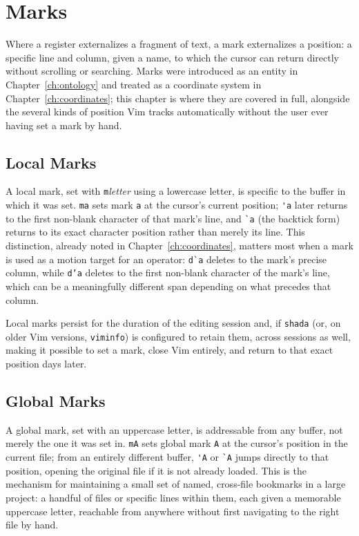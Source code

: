 \chapter{Marks}
\label{ch:marks}

Where a register externalizes a fragment of text, a mark externalizes a position: a specific line and column, given a name, to which the cursor can return directly without scrolling or searching. Marks were introduced as an entity in Chapter~\ref{ch:ontology} and treated as a coordinate system in Chapter~\ref{ch:coordinates}; this chapter is where they are covered in full, alongside the several kinds of position Vim tracks automatically without the user ever having set a mark by hand.

\section{Local Marks}

A local mark, set with \texttt{m}\textit{letter} using a lowercase letter, is specific to the buffer in which it was set. \texttt{ma} sets mark \texttt{a} at the cursor's current position; \verb|'a| later returns to the first non-blank character of that mark's line, and \verb|`a| (the backtick form) returns to its exact character position rather than merely its line. This distinction, already noted in Chapter~\ref{ch:coordinates}, matters most when a mark is used as a motion target for an operator: \texttt{d\`{}a} deletes to the mark's precise column, while \texttt{d'a} deletes to the first non-blank character of the mark's line, which can be a meaningfully different span depending on what precedes that column.

Local marks persist for the duration of the editing session and, if \texttt{shada} (or, on older Vim versions, \texttt{viminfo}) is configured to retain them, across sessions as well, making it possible to set a mark, close Vim entirely, and return to that exact position days later.

\section{Global Marks}

A global mark, set with an uppercase letter, is addressable from any buffer, not merely the one it was set in. \texttt{mA} sets global mark \texttt{A} at the cursor's position in the current file; from an entirely different buffer, \verb|'A| or \verb|`A| jumps directly to that position, opening the original file if it is not already loaded. This is the mechanism for maintaining a small set of named, cross-file bookmarks in a large project: a handful of files or specific lines within them, each given a memorable uppercase letter, reachable from anywhere without first navigating to the right file by hand.

